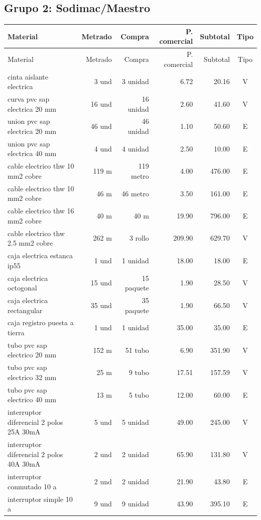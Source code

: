 \subsection{Grupo 2: Sodimac/Maestro}
\scriptsize
\begin{longtable}{p{6.0cm}r r r r c}
\toprule Material & Metrado & Compra & P. comercial & Subtotal & Tipo \\ \midrule
\endfirsthead\toprule Material & Metrado & Compra & P. comercial & Subtotal & Tipo \\ \midrule\endhead
cinta aislante electrica & 3 und & 3 unidad & 6.72 & 20.16 & V \\
curva pvc sap electrica 20 mm & 16 und & 16 unidad & 2.60 & 41.60 & V \\
union pvc sap electrica 20 mm & 46 und & 46 unidad & 1.10 & 50.60 & E \\
union pvc sap electrica 40 mm & 4 und & 4 unidad & 2.50 & 10.00 & E \\
cable electrico thw 10 mm2 cobre & 119 m & 119 metro & 4.00 & 476.00 & E \\
cable electrico thw 10 mm2 cobre & 46 m & 46 metro & 3.50 & 161.00 & E \\
cable electrico thw 16 mm2 cobre & 40 m & 40 m & 19.90 & 796.00 & E \\
cable electrico thw 2.5 mm2 cobre & 262 m & 3 rollo & 209.90 & 629.70 & V \\
caja electrica estanca ip55 & 1 und & 1 unidad & 18.00 & 18.00 & E \\
caja electrica octogonal & 15 und & 15 paquete & 1.90 & 28.50 & V \\
caja electrica rectangular & 35 und & 35 paquete & 1.90 & 66.50 & V \\
caja registro puesta a tierra & 1 und & 1 unidad & 35.00 & 35.00 & E \\
tubo pvc sap electrico 20 mm & 152 m & 51 tubo & 6.90 & 351.90 & V \\
tubo pvc sap electrico 32 mm & 25 m & 9 tubo & 17.51 & 157.59 & V \\
tubo pvc sap electrico 40 mm & 13 m & 5 tubo & 12.00 & 60.00 & E \\
interruptor diferencial 2 polos 25A 30mA & 5 und & 5 unidad & 49.00 & 245.00 & V \\
interruptor diferencial 2 polos 40A 30mA & 2 und & 2 unidad & 65.90 & 131.80 & V \\
interruptor conmutado 10 a & 2 und & 2 unidad & 21.90 & 43.80 & E \\
interruptor simple 10 a & 9 und & 9 unidad & 43.90 & 395.10 & E \\

\end{longtable}
